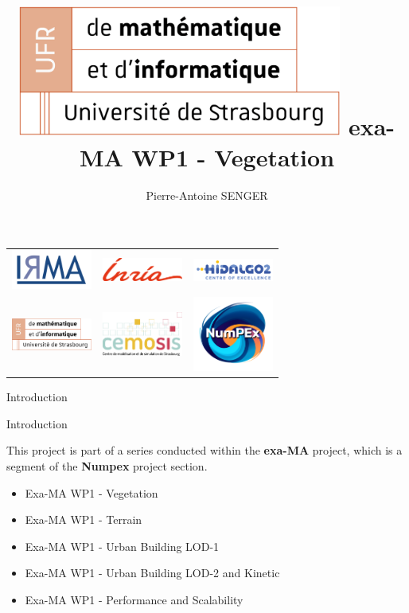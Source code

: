 \documentclass[10pt]{beamer}
\title[ExaMA WP1 Vegetation]{
  \includegraphics[width=0.8\textwidth]{images/logo-ufr.png}
  exa-MA WP1 - Vegetation}
\author[PA Senger]{Pierre-Antoine SENGER}
\begin{document}
\begin{frame}[plain]
    \begin{center}
    \begin{tabular}{c c c}
    \includegraphics[width=100px]{images/logo-irma.png} &
    \includegraphics[width=100px]{images/logo-inria.png} &
    \includegraphics[width=100px]{images/logo-hidalgo2.png} \\
    \includegraphics[width=100px]{images/logo-ufr.png} &
    \includegraphics[width=100px]{images/logo-cemosis.png} &
    \includegraphics[width=100px]{images/logo-numpex.png} \\
    \end{tabular}
    \end{center}
\end{frame}

\begin{frame}{Introduction}
  \titlepage
\end{frame}

\begin{frame}{Introduction}

	This project is part of a series conducted within the \textbf{exa-MA} project,
	which is a segment of the \textbf{Numpex} project section.

	\vspace{1em}

	\begin{itemize}
		\item Exa-MA WP1 - Vegetation
		\item Exa-MA WP1 - Terrain
		\item Exa-MA WP1 - Urban Building LOD-1
		\item Exa-MA WP1 - Urban Building LOD-2 and Kinetic
		\item Exa-MA WP1 - Performance and Scalability
	\end{itemize}
\end{frame}
\end{document}
